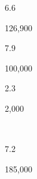 \begin{description}[font=\normalfont,style=nextline]
\begin{multicols}{2}
\begin{description}[font=\normalfont\itshape,noitemsep]
 \item[] 
 \item[\pbnumberabbr] 6.6 
 \item[\family] \famNECaucasian 
 \item[]
\item[\nativespeakers] 126,900 
 \item[\region] \regionNCaucasus 
 \end{description}\end{multicols}
\item[\langnameTadaksahak] 
 \begin{multicols}{2}\begin{description}[font=\normalfont\itshape,noitemsep] 
 \item[] 
 \item[\pbnumberabbr] 7.9 
 \item[\family] \famNiloSaharan 
 \item[]
\item[\nativespeakers] 100,000 
 \item[\region] \regionMali\EnumComma\regionNiger 
 \end{description}\end{multicols}
\item[\langnameTagbanwa] 
 \begin{multicols}{2}\begin{description}[font=\normalfont\itshape,noitemsep] 
 \item[] 
 \item[\pbnumberabbr] 2.3 
 \item[\family] \famAustronesian 
 \item[]
\item[\nativespeakers] 2,000 
 \item[\region] \regionPalawan\ \Brackets{\regionPhilippines}
 \end{description}\end{multicols}
\item[\langnameTahitian] 
 \begin{multicols}{2}\begin{description}[font=\normalfont\itshape,noitemsep] 
 \item[] 
 \item[\pbnumberabbr] 7.2 
 \item[\family] \famAustronesian 
 \item[]
\item[\nativespeakers] 185,000 
 \item[\region] \regionFrenchPolynesia 

\end{description}
\end{multicols}
\end{description}
